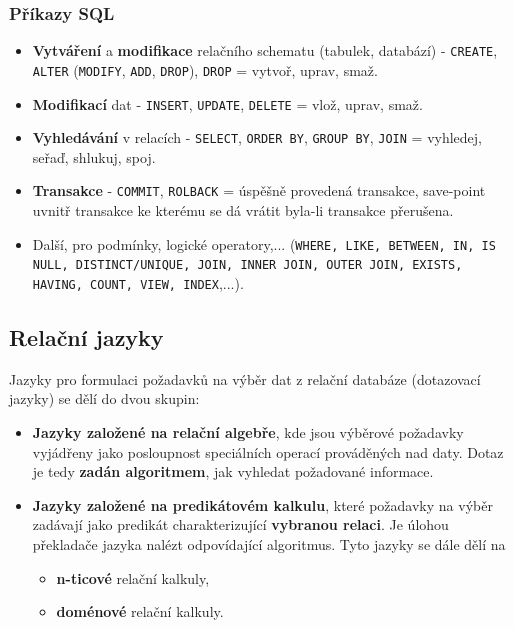 \subsubsection{Příkazy SQL}
\begin{itemize}
\item \textbf{Vytváření} a \textbf{modifikace} relačního schematu (tabulek, databází) - \texttt{CREATE}, \texttt{ALTER} (\texttt{MODIFY}, \texttt{ADD}, \texttt{DROP}), \texttt{DROP}  = vytvoř, uprav, smaž.
\item \textbf{Modifikací} dat -  \texttt{INSERT}, \texttt{UPDATE}, \texttt{DELETE} = vlož, uprav, smaž.
\item \textbf{Vyhledávání} v relacích -  \texttt{SELECT}, \texttt{ORDER BY},  \texttt{GROUP BY}, \texttt{JOIN} = vyhledej, seřaď, shlukuj, spoj.
\item \textbf{Transakce} - \texttt{COMMIT}, \texttt{ROLBACK} = úspěšně provedená transakce, save-point uvnitř transakce ke kterému se dá vrátit byla-li transakce přerušena.
\item Další, pro podmínky, logické operatory,... (\texttt{WHERE, LIKE, BETWEEN, IN, IS NULL, DISTINCT/UNIQUE, JOIN, INNER JOIN, OUTER JOIN, EXISTS, HAVING, COUNT, VIEW, INDEX},...).
\end{itemize}

\subsection{Relační jazyky}
Jazyky pro formulaci požadavků na výběr dat z relační databáze (dotazovací jazyky) se dělí do dvou skupin:
\begin{itemize}
\item \textbf{Jazyky založené na  relační algebře}, kde jsou výběrové požadavky vyjádřeny jako posloupnost speciálních operací prováděných nad daty. Dotaz je tedy  \textbf{zadán algoritmem}, jak vyhledat požadované informace.
\item \textbf{Jazyky založené na  predikátovém kalkulu}, které požadavky na výběr zadávají jako predikát charakterizující \textbf{vybranou relaci}. Je úlohou překladače jazyka nalézt odpovídající algoritmus. Tyto jazyky se dále dělí na 
\begin{itemize}
	\item \textbf{n-ticové} relační kalkuly,
	\item \textbf{doménové} relační kalkuly. 
\end{itemize}
\end{itemize}

